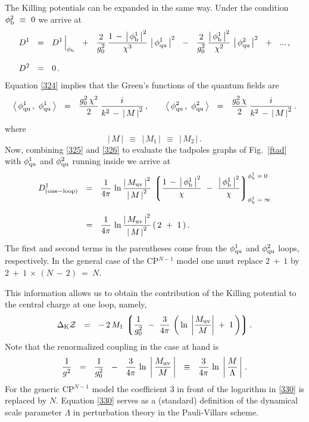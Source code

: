 \documentclass[epsfig,12pt]{article}
\def\beq{\begin{equation}}
\def\eeq{\end{equation}}
\def\beq{\begin{equation}}
\def\eeq{\end{equation}}
\newcommand{\lgr}{\left\lgroup}
\newcommand{\rgr}{\right\rgroup}
\begin{document}
	The Killing potentials can be expanded in the same way. Under the condition $\phi^2_{\rm b} ~\equiv~ 0$ 
	we arrive at
\begin{align}
%
\nonumber
	D^1  & ~~=~~
 	D^1 \, \Big|_{\phi_{\rm b}}  ~~+~~  
	\frac{2}{g_0^2}\, \frac{1 \,-\, \left|\, \phi^1_{\rm b} \,\right|^2}{\chi^3}\, 
	\left|\,  \phi^1_{\rm qu}\, \right|^2 ~~-~~  
	\frac{2}{g_0^2}\, \frac{\left|\, \phi^1_{\rm b} \,\right|^2}{\chi^2}\, 
	\left|\,  \phi^2_{\rm qu} \,\right|^2  ~~+~~  ...\,,
	\\[3mm]
%
	D^2  & ~~=~~  0\,.
\label{325}
\end{align}
	Equation \eqref{324}
	implies that the Green's functions of the quantum fields are
\beq
	\left\langle\, \phi^1_{\rm qu}\,,~ \phi^1_{\rm qu} \,\right\rangle  ~~=~~  
	\frac{g_0^2\,\chi^2 }{2}\, \frac{i}{k^2 \,-\, \left|\, M \,\right|^2}\,,
	\qquad
	\left\langle\, \phi^2_{\rm qu}\,,~ \phi^2_{\rm qu} \,\right\rangle  ~~=~~ 
	\frac{g_0^2\,\chi }{2 }\, \frac{i}{k^2 \,-\, \left|\, M \,\right|^2}\,.
\label{326}
\eeq
	where 
\beq
	\left|\, M \,\right|  ~~\equiv~~ \left|\, M_1 \,\right|  ~~\equiv~~ \left|\, M_2 \,\right|\,.
\eeq
	Now, combining \eqref{325} and \eqref{326} to evaluate the tadpoles graphs of Fig.~\ref{ftad}
	with $\phi^1_{\rm qu}$ and $\phi^2_{\rm qu}$ running inside we arrive at
\begin{align}
%
\nonumber
	D^1_{\rm (one-loop)} 
	&  ~~=~~
	\frac{1}{4\pi}\, \ln \frac{\left|\, M_{\rm uv} \,\right|^2}{\left|\, M \,\right|^2}\,
	\lgr \frac{1 \,-\, \left|\, \phi^1_{\rm b} \,\right|^2}{\chi} 
		~-~ \frac{ \left|\, \phi^1_{\rm b} \,\right|^2}{\chi}
	\rgr^{\phi_{\rm b}^{1} \;=\; 0}_{\phi_{\rm b}^{1} \;=\; \infty}
	\\[3mm]
%
	&  ~~=~~  
	\frac{1}{4\pi}\, \ln \frac{ \left|\, M_{\rm uv} \,\right|^2}{\left|\, M \,\right|^2}
	\left(\, 2 ~+~ 1 \,\right).
\end{align}
	The first and second terms in the parentheses come from the $\phi^1_{\rm qu}$ and $\phi^2_{\rm qu}$ loops, respectively. 
	In the general case of the CP$^{N-1}$ model
	one must replace $ 2 ~+~ 1$ by $ 2 ~+~ 1 \,\times\, (N \,-\, 2) ~=~ N$.

	This information allows us to obtain the contribution of the Killing potential to the central charge at one loop, namely,
\beq
	\Delta_{\rm K}{\mathcal Z}  ~~=~~  
	-\, 2\,M_1\, \lgr 
		\frac{1}{g_0^2} ~-~
		\frac{3}{4\pi}\, \left(\, \ln\; \left| \frac{M_{\rm uv}}{M} \right| \;+\; 1
			\,\right) 
		\rgr .
\label{329}
\eeq
	Note that the renormalized coupling in the case at hand is \cite{Novikov:1984ac}
\beq
	\frac{1}{g^2}  ~~=~~  \frac{1}{g_0^2} ~~-~~
	\frac{3}{4\pi}\, \ln\; \left|\, \frac{M_{\rm uv}}{M} \,\right|  ~~\equiv~~   
	\frac{3}{4\pi}\, \ln\; \left|\, \frac{M}{\Lambda} \,\right|\,.
\label{330}
\eeq
	For the generic CP$^{N-1}$ model the coefficient 3 in front of the logarithm 
	in \eqref{330} is replaced by $ N $. 
	Equation \eqref{330} serves as a (standard) definition of the dynamical scale parameter $ \Lambda $ 
	in perturbation theory in the Pauli-Villars scheme.
\end{document}
